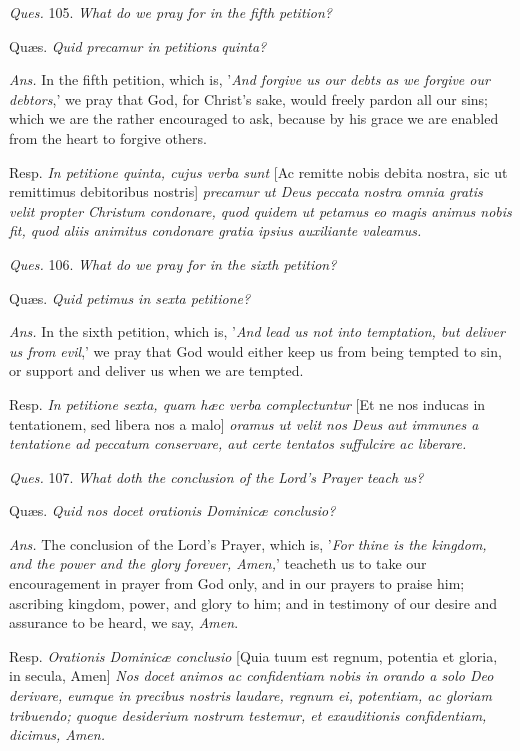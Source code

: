 \emph{Ques.} 105. \emph{What do we pray for in the fifth petition?}

Quæs. \emph{Quid precamur in petitions quinta?}

\emph{Ans.} In the fifth petition, which is, '\emph{And forgive us our debts as we forgive our debtors},' we pray that God, for Christ's sake, would freely pardon all our sins; which we are the rather encouraged to ask, because by his grace we are enabled from the heart to forgive others.

Resp. \emph{In petitione quinta, cujus verba sunt} [Ac remitte nobis debita nostra, sic ut remittimus debitoribus nostris] \emph{precamur ut Deus peccata nostra omnia gratis velit propter Christum condonare, quod quidem ut petamus eo magis animus nobis fit, quod aliis animitus condonare gratia ipsius auxiliante valeamus.}

\emph{Ques.} 106. \emph{What do we pray for in the sixth petition?}

Quæs. \emph{Quid petimus in sexta petitione?}

\emph{Ans.} In the sixth petition, which is, '\emph{And lead us not into temptation, but deliver us from evil},' we pray that God would either keep us from being tempted to sin, or support and deliver us when we are tempted.

Resp. \emph{In petitione sexta, quam hæc verba complectuntur} [Et ne nos inducas in tentationem, sed libera nos a malo] \emph{oramus ut velit nos Deus aut immunes a tentatione ad peccatum conservare, aut certe tentatos suffulcire ac liberare.}

\emph{Ques.} 107. \emph{What doth the conclusion of the Lord's Prayer teach us?}

Quæs. \emph{Quid nos docet orationis Dominicæ conclusio?}

\emph{Ans.} The conclusion of the Lord's Prayer, which is, '\emph{For thine is the kingdom, and the power and the glory forever, Amen,}' teacheth us to take our encouragement in prayer from God only, and in our prayers to praise him; ascribing kingdom, power, and glory to him; and in testimony of our desire and assurance to be heard, we say, \emph{Amen}.

Resp. \emph{Orationis Dominicæ conclusio} [Quia tuum est regnum, potentia et gloria, in secula, Amen] \emph{Nos docet animos ac confidentiam nobis in orando a solo Deo derivare, eumque in precibus nostris laudare, regnum ei, potentiam, ac gloriam tribuendo; quoque desiderium nostrum testemur, et exauditionis confidentiam, dicimus, Amen.}

